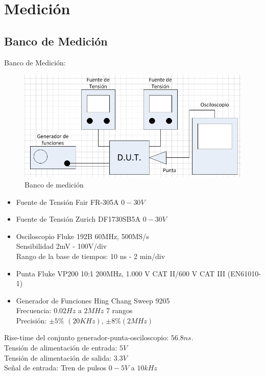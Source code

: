 \documentclass[12pt,a4paper]{article}
\begin{document}
\newpage
\section{\textbf{Medición}}
\subsection{Banco de Medición}

Banco de Medición:

\begin{figure}[H]
\centering
\includegraphics[width=\textwidth]{img/Banco.png}
\caption{Banco de medición}
\end{figure}

\begin{itemize}
\item Fuente de Tensión Fair FR-305A $0-30V$ 
\item Fuente de Tensión Zurich DF1730SB5A $0-30V$
\item Osciloscopio Fluke 192B 60MHz, 500MS/s\\
Sensibilidad 2mV - 100V/div\\
Rango de la base de tiempos: 10 ns - 2 min/div
\item Punta Fluke VP200 10:1 200MHz, 1.000 V CAT II/600 V CAT III (EN61010-1)
\item Generador de Funciones Hing Chang Sweep 9205\\
Frecuencia: $0.02Hz$ a $2MHz$ 7 rangos\\
Precisión: $\pm 5\%$ $(20KHz)$, $\pm 8\% (2MHz)$ 
\end{itemize}

Rise-time del conjunto generador-punta-osciloscopio: $56.8ns$.\\

Tensión de alimentación de entrada: $5V$\\
Tensión de alimentación de salida: $3.3V$\\
Señal de entrada: Tren de pulsos $0-5V$ a $10kHz$\\
\end{document}
